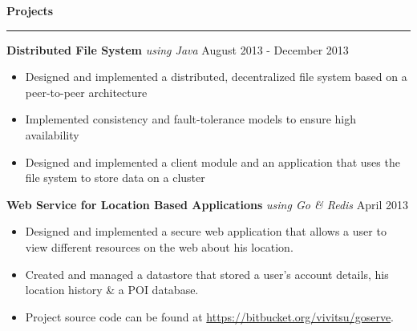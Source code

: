\documentclass[10pt]{article}
\begin{document}
\textbf{Projects}
\smallskip
\hrule
\textbf{Distributed File System} \textit{using Java} \hfill August 2013 - December 2013
\begin{itemize}
    \item Designed and implemented a distributed, decentralized file system based on a peer-to-peer architecture
    \item Implemented consistency and fault-tolerance models to ensure high availability
    \item Designed and implemented a client module and an application that uses the file system to store data on a cluster
\end{itemize}
\textbf{Web Service for Location Based Applications} \textit{using Go \& Redis} \hfill April 2013
\begin{itemize}
    \item Designed and implemented a secure web application that allows a user to view different resources on the web about his location.
    \item Created and managed a datastore that stored a user's account details, his location history \& a POI database.
    \item Project source code can be found at \url{https://bitbucket.org/vivitsu/goserve}.
\end{itemize}
\end{document}
